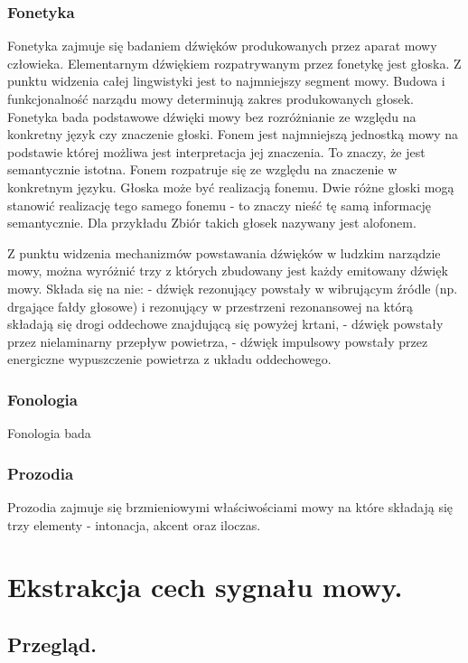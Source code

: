 \subsubsection{Fonetyka}
Fonetyka zajmuje się badaniem dźwięków produkowanych przez aparat mowy człowieka. Elementarnym dźwiękiem rozpatrywanym przez fonetykę jest głoska. Z punktu widzenia całej lingwistyki jest to najmniejszy segment mowy. Budowa i funkcjonalność narządu mowy determinują zakres produkowanych głosek. Fonetyka bada podstawowe dźwięki mowy bez rozróżnianie ze względu na konkretny język czy znaczenie głoski.
Fonem jest najmniejszą jednostką mowy na podstawie której możliwa jest interpretacja jej znaczenia. To znaczy, że jest semantycznie istotna. Fonem rozpatruje się ze względu na znaczenie w konkretnym języku. Głoska może być realizacją fonemu. Dwie różne głoski mogą stanowić realizację tego samego fonemu - to znaczy nieść tę samą informację semantycznie. Dla przykładu 
Zbiór takich głosek nazywany jest alofonem.

Z punktu widzenia mechanizmów powstawania dźwięków w ludzkim narządzie mowy, można wyróżnić trzy z których zbudowany jest każdy emitowany dźwięk mowy. Składa się na nie:
- dźwięk rezonujący powstały w wibrującym źródle (np. drgające fałdy głosowe) i rezonujący w przestrzeni rezonansowej na którą składają się drogi oddechowe znajdującą się powyżej krtani,
- dźwięk powstały przez nielaminarny przepływ powietrza,
- dźwięk impulsowy powstały przez energiczne wypuszczenie powietrza z układu oddechowego.

\subsubsection{Fonologia}
Fonologia bada

\subsubsection{Prozodia}
Prozodia zajmuje się brzmieniowymi właściwościami mowy na które składają się trzy elementy - intonacja, akcent oraz iloczas.

\section{Ekstrakcja cech sygnału mowy.}

\subsection{Przegląd.}

